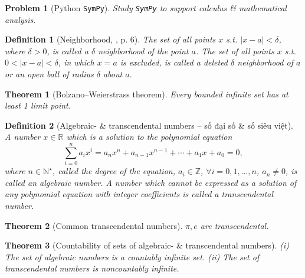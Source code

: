\documentclass{article}
\newtheorem{definition}{Definition}
\newtheorem{problem}{Problem}
\newtheorem{theorem}{Theorem}
\begin{document}
\begin{problem}[Python {\tt SymPy}]
	Study {\tt SymPy} to support calculus \& mathematical analysis.
\end{problem}

\begin{definition}[Neighborhood, \cite{Wrede_Spiegel2010}, p. 6]
	The set of all points $x$ s.t. $|x - a| < \delta$, where $\delta > 0$, is called a $\delta$ {\rm neighborhood} of the point $a$. The set of all points $x$ s.t. $0 < |x - a| < \delta$, in which $x = a$ is excluded, is called a {\rm deleted $\delta$ neighborhood} of $a$ or an open ball of radius $\delta$ about $a$.
\end{definition}

\begin{theorem}[Bolzano--Weierstrass theorem]
	Every bounded infinite set has at least 1 limit point.
\end{theorem}

\begin{definition}[Algebraic- \& transcendental numbers -- số đại số \& số siêu việt]
	A number $x\in\mathbb{R}$ which is a solution to the {\rm polynomial equation}
	\begin{equation}
		\label{polynomial eqn}
		\sum_{i=0}^n a_ix^i = a_nx^n + a_{n-1}x^{n-1} + \cdots + a_1x + a_0 = 0,
	\end{equation}
	where $n\in\mathbb{N}^\star$, called the {\rm degree} of the equation, $a_i\in\mathbb{Z}$, $\forall i = 0,1,\ldots,n$, $a_n\ne0$, is called an {\rm algebraic number}. A number which cannot be expressed as a solution of any polynomial equation with integer coefficients is called a {\rm transcendental number}.
\end{definition}

\begin{theorem}[Common transcendental numbers]
	$\pi,e$ are transcendental.
\end{theorem}

\begin{theorem}[Countability of sets of algebraic- \& transcendental numbers]
	(i) The set of algebraic numbers is a countably infinite set. (ii) The set of transcendental numbers is noncountably infinite.
\end{theorem}

\end{document}
